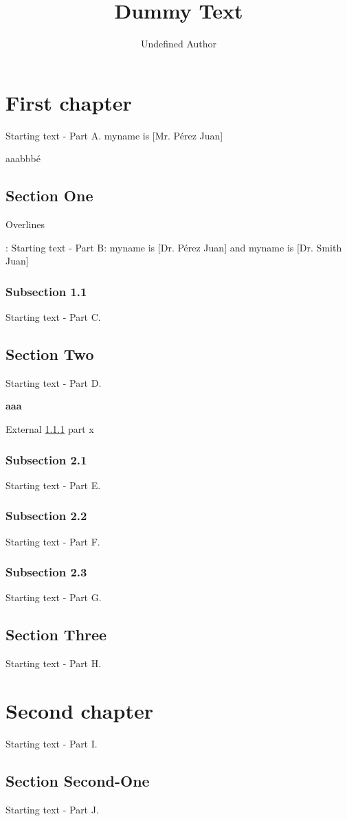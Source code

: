 \documentclass[12pt,twoside]{book}%
\title{Dummy Text}
\author{Undefined Author}
\date{}
\begin{document}
%


\maketitle{}%


\chapter{First chapter}%

Starting text - Part A.
myname is [Mr. Pérez Juan]

aaabbbé

%

{
\centering%
\section{Section One}%

%

{
\Overline{}%
%

{
%
Overlines

}
%


}
%
: Starting text - Part B: myname is [Dr. Pérez Juan] and myname is [Dr. Smith Juan]
\subsection{Subsection 1.1}%
\label{x}%

Starting text - Part C.


}
%
\section{Section Two}%

Starting text - Part D.
%

{
\bfseries{}%
\label{Inner example}aaa

}
%

External \ref{x}%
part\pageref{x}%
x
\subsection{Subsection 2.1}%

Starting text - Part E.
%

{
\raggedleft%
\subsection{Subsection 2.2}%

Starting text - Part F.


}
%
\subsection{Subsection 2.3}%

Starting text - Part G.
\section{Section Three}%

Starting text - Part H.
\chapter{Second chapter}%

Starting text - Part I.
\section{Section Second-One}%

Starting text - Part J.

%
\end{document}
